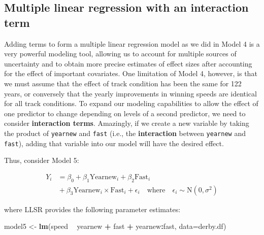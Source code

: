 \documentclass[
]{krantz}
\newenvironment{Shaded}{\begin{snugshade}}{\end{snugshade}}
\newcommand{\DataTypeTok}[1]{\textcolor[rgb]{0.27,0.27,0.27}{#1}}
\newcommand{\KeywordTok}[1]{\textcolor[rgb]{0.27,0.27,0.27}{\textbf{#1}}}
\newcommand{\NormalTok}[1]{#1}
\newcommand{\OperatorTok}[1]{\textcolor[rgb]{0.43,0.43,0.43}{\textbf{#1}}}
\newcommand{\StringTok}[1]{\textcolor[rgb]{0.5,0.5,0.5}{#1}}
\begin{document}
\hypertarget{multiple-linear-regression-with-an-interaction-term}{%
\subsection{Multiple linear regression with an interaction term}\label{multiple-linear-regression-with-an-interaction-term}}

Adding terms to form a multiple linear regression model as we did in Model 4 is a very powerful modeling tool, allowing us to account for multiple sources of uncertainty and to obtain more precise estimates of effect sizes after accounting for the effect of important covariates. One limitation of Model 4, however, is that we must assume that the effect of track condition has been the same for 122 years, or conversely that the yearly improvements in winning speeds are identical for all track conditions. To expand our modeling capabilities to allow the effect of one predictor to change depending on levels of a second predictor, we need to consider \textbf{interaction terms}.  Amazingly, if we create a new variable by taking the product of \texttt{yearnew} and \texttt{fast} (i.e., the \textbf{interaction} between \texttt{yearnew} and \texttt{fast}), adding that variable into our model will have the desired effect.

Thus, consider Model 5:

\begin{equation*}
\begin{split}
Y_{i}&= \beta_{0}+\beta_{1}\textrm{Yearnew}_{i}+\beta_{2}\textrm{Fast}_{i} \\
      &{}+\beta_{3}\textrm{Yearnew}_{i}\times\textrm{Fast}_{i}+\epsilon_{i}\quad \textrm{where}\quad \epsilon_{i}\sim \textrm{N}(0,\sigma^2)
\end{split}
\end{equation*}

where LLSR provides the following parameter estimates:

\begin{Shaded}
\begin{Highlighting}[]
\NormalTok{model5 <-}\StringTok{ }\KeywordTok{lm}\NormalTok{(speed }\OperatorTok{~}\StringTok{ }\NormalTok{yearnew }\OperatorTok{+}\StringTok{ }\NormalTok{fast }\OperatorTok{+}\StringTok{ }\NormalTok{yearnew}\OperatorTok{:}\NormalTok{fast, }
             \DataTypeTok{data=}\NormalTok{derby.df)}
\end{Highlighting}
\end{Shaded}
\end{document}
